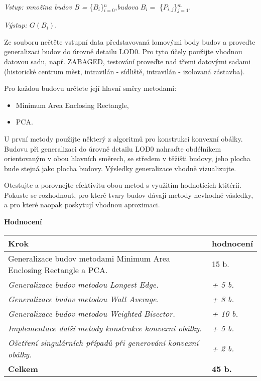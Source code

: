 \documentclass[15pt]{article}
\begin{document}
\begin{spacing}{1.5}

\noindent\emph{Vstup: množina budov B =} \{$B_i$\}$_{i=0}^n$,\emph{budova} $B_i = $  \{$P_{i,j}$\}$_{j=1}^m$.

\noindent\emph{Výstup: $G(B_i)$}.

\noindent Ze souboru nečtěte vstupní data představovaná lomovými body budov a proveďte generalizaci budov do úrovně detailu LOD0. Pro tyto účely použijte vhodnou datovou sadu, např. ZABAGED, testování proveďte nad třemi datovými sadami (historické centrum měst, intravilán - sídliště, intravilán - izolovaná zástavba). 

\noindent Pro každou budovu určtete její hlavní směry metodami:

\begin{itemize}
  \item Minimum Area Enclosing Rectangle,
  \item PCA.
\end{itemize}

\noindent U první metody použijte některý z algoritmů pro konstrukci konvexní obálky. Budovu při generalizaci do úrovně detailu LOD0 nahraďte obdélníkem orientovaným v obou hlavních směrech, se středem v těžišti budovy, jeho plocha bude stejná jako plocha budovy. Výsledky generalizace vhodně vizualizujte.

\noindent Otestujte a porovnejte efektivitu obou metod s využitím hodnotících ktitérií. Pokuste se rozhodnout, pro které tvary budov dávají metody nevhodné vásledky, a pro které naopak poskytují vhodnou aproximaci.

\bigbreak

\noindent\textbf{Hodnocení}
\bigbreak
\begin{center}
\begin{tabular}{|l|l|}

\hline
\textbf{Krok} & \textbf{hodnocení} \\ [0.5ex]  \hline\hline
Generalizace budov metodami Minimum Area Enclosing Rectangle a PCA. & 15 b. \\ \hline
\textit{Generalizace budov metodou Longest Edge.} & \textit{+ 5 b.} \\ \hline
\textit{Generalizace budov metodou Wall Average.} & \textit{+ 8 b.} \\ \hline
\textit{Generalizace budov metodou Weighted Bisector.} & \textit{+ 10 b.} \\ \hline
\textit{Implementace další metody konstrukce konvexní obálky.} & \textit{+ 5 b.} \\ \hline
\textit{Ošetření singulárních případů při generování konvexní obálky.} & \textit{+ 2 b.} \\ \hline
\textbf{Celkem} & \textbf{45 b.} \\ [0.5ex]  \hline


\end{tabular}
\end{center}
\end{spacing}
\end{document}

